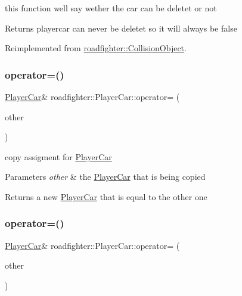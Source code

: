 this function well say wether the car can be deletet or not \begin{DoxyReturn}{Returns}
playercar can never be deletet so it will always be false 
\end{DoxyReturn}


Reimplemented from \hyperlink{classroadfighter_1_1CollisionObject_a738071cd7b1b8cd4c8d455b5e552bd4c}{roadfighter\+::\+Collision\+Object}.

\mbox{\label{classroadfighter_1_1PlayerCar_a1913e3231449aa67ad450ac15267086b}} 
\subsubsection{\texorpdfstring{operator=()}{operator=()}\hspace{0.1cm}{\footnotesize\ttfamily [1/2]}}
{\footnotesize\ttfamily \hyperlink{classroadfighter_1_1PlayerCar}{Player\+Car}\& roadfighter\+::\+Player\+Car\+::operator= (\begin{DoxyParamCaption}\item[{const \hyperlink{classroadfighter_1_1PlayerCar}{Player\+Car} \&}]{other }\end{DoxyParamCaption})\hspace{0.3cm}{\ttfamily [default]}}

copy assigment for \hyperlink{classroadfighter_1_1PlayerCar}{Player\+Car} 
\begin{DoxyParams}{Parameters}
{\em other} & the \hyperlink{classroadfighter_1_1PlayerCar}{Player\+Car} that is being copied \\
\hline
\end{DoxyParams}
\begin{DoxyReturn}{Returns}
a new \hyperlink{classroadfighter_1_1PlayerCar}{Player\+Car} that is equal to the other one 
\end{DoxyReturn}
\mbox{\label{classroadfighter_1_1PlayerCar_aa6938d2531fea4938eb0837fb2763304}} 
\subsubsection{\texorpdfstring{operator=()}{operator=()}\hspace{0.1cm}{\footnotesize\ttfamily [2/2]}}
{\footnotesize\ttfamily \hyperlink{classroadfighter_1_1PlayerCar}{Player\+Car}\& roadfighter\+::\+Player\+Car\+::operator= (\begin{DoxyParamCaption}\item[{\hyperlink{classroadfighter_1_1PlayerCar}{Player\+Car} \&\&}]{other }\end{DoxyParamCaption})\hspace{0.3cm}{\ttfamily [default]}}

